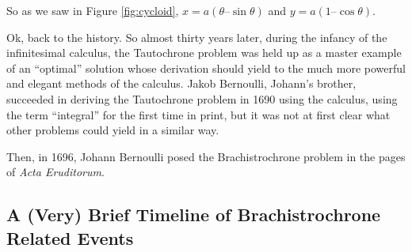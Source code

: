 \documentclass{article}
\theoremstyle{definition}
\begin{document}
\bigskip
\noindent
So as we saw in Figure \ref{fig:cycloid}, $x = a (\theta – \sin
\theta)$ and $y = a (1 – \cos \theta)$. 


\bigskip
\noindent
Ok, back to the history. So almost thirty years later, during the
infancy of the infinitesimal calculus, the Tautochrone problem
was held up as a master example of an “optimal” solution whose
derivation should yield to the much more powerful and elegant
methods of the calculus. Jakob Bernoulli, Johann’s brother,
succeeded in deriving the Tautochrone problem in 1690 using the
calculus, using the term “integral” for the first time in print,
but it was not at first clear what other problems could yield in
a similar way. 

\bigskip
\noindent
Then, in 1696, Johann Bernoulli posed the Brachistrochrone
problem in the pages of \emph{Acta Eruditorum}.   

\subsection{A (Very) Brief Timeline of Brachistrochrone Related Events}

\bigskip
\end{document}
